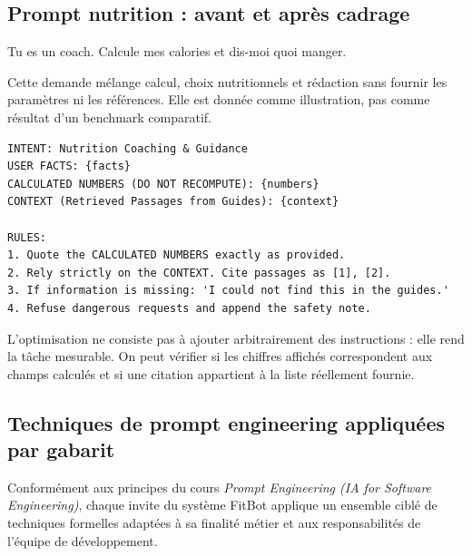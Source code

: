 \documentclass[11pt,a4paper]{article}
\begin{document}
\subsection{Prompt nutrition : avant et après cadrage}
\begin{tcolorbox}[colback=red!3,colframe=codered,title=Exemple pédagogique insuffisamment cadré]
\small\ttfamily
Tu es un coach. Calcule mes calories et dis-moi quoi manger.
\end{tcolorbox}
Cette demande mélange calcul, choix nutritionnels et rédaction sans fournir les paramètres ni les références. Elle est donnée comme illustration, pas comme résultat d'un benchmark comparatif.
\begin{lstlisting}[caption={Structure du gabarit nutrition effectivement utilisé, extrait abrégé}]
INTENT: Nutrition Coaching & Guidance
USER FACTS: {facts}
CALCULATED NUMBERS (DO NOT RECOMPUTE): {numbers}
CONTEXT (Retrieved Passages from Guides): {context}

RULES:
1. Quote the CALCULATED NUMBERS exactly as provided.
2. Rely strictly on the CONTEXT. Cite passages as [1], [2].
3. If information is missing: 'I could not find this in the guides.'
4. Refuse dangerous requests and append the safety note.
\end{lstlisting}
L'optimisation ne consiste pas à ajouter arbitrairement des instructions : elle rend la tâche mesurable. On peut vérifier si les chiffres affichés correspondent aux champs calculés et si une citation appartient à la liste réellement fournie.

\subsection{Techniques de prompt engineering appliquées par gabarit}
Conformément aux principes du cours \textit{Prompt Engineering (IA for Software Engineering)}, chaque invite du système FitBot applique un ensemble ciblé de techniques formelles adaptées à sa finalité métier et aux responsabilités de l'équipe de développement.
\end{document}
